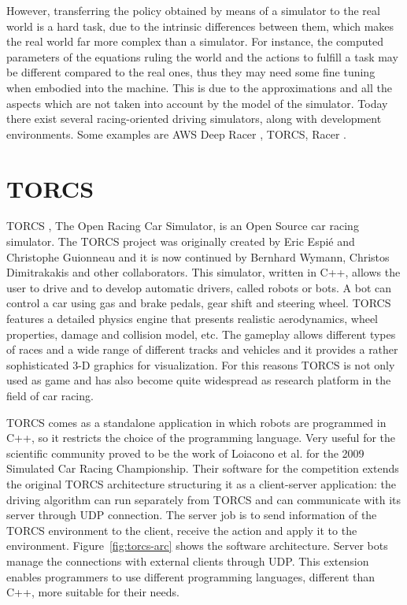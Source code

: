 However, transferring the policy obtained by means of a simulator to the real world is a hard task, due to the intrinsic differences between them, which makes the real world far more complex than a simulator. For instance, the computed parameters of the equations ruling the world and the actions to fulfill a task may be different compared to the real ones, thus they may need some fine tuning when embodied into the machine. This is due to the approximations and all the aspects which are not taken into account by the model of the simulator.
Today there exist several racing-oriented driving simulators, along with development environments. Some examples are AWS Deep Racer \cite{deepracer}, TORCS, Racer \cite{carsim}.

\section{TORCS}
TORCS \cite{TORCS}, The Open Racing Car Simulator, is an Open Source car racing simulator. The TORCS project was originally created by Eric Espié and Christophe Guionneau and it is now continued by Bernhard Wymann, Christos Dimitrakakis and other collaborators. This simulator, written in C++, allows the user to drive and to develop automatic drivers, called robots or bots. A bot can control a car using gas and brake pedals, gear shift and steering wheel. TORCS features a detailed physics engine that presents realistic aerodynamics, wheel properties, damage and collision model, etc. The gameplay allows different types of races and a wide range of different tracks and vehicles and it provides a rather sophisticated 3-D graphics for visualization. For this reasons TORCS is not only used as game and has also become quite widespread as research platform in the field of car racing.

TORCS comes as a standalone application in which robots are programmed in C++, so it restricts the choice of the programming language. Very useful for the scientific community proved to be the work of Loiacono et al. \cite{SCRC} for the 2009 Simulated Car Racing Championship. Their software for the competition extends the original TORCS architecture structuring it as a client-server application: the driving algorithm can run separately from TORCS and can communicate with its server through UDP connection. The server job is to send information of the TORCS environment to the client, receive the action and apply it to the environment.
Figure~\ref{fig:torcs-arc} shows the software architecture. Server bots manage the connections with external clients through UDP. This extension enables programmers to use different programming languages, different than C++, more suitable for their needs.

